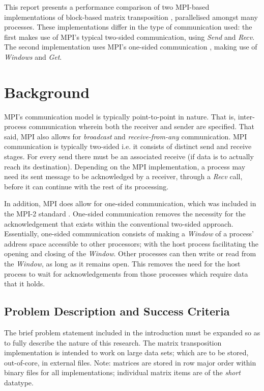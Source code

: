 \documentclass[journal,10pt,a4paper]{IEEEtran}
\begin{document}
This report presents a performance comparison of two MPI-based implementations of block-based matrix transposition \cite{transp}, parallelised amongst many processes. These implementations differ in the type of communication used: the first makes use of MPI's typical two-sided communication, using \textit{Send} and \textit{Recv}. The second implementation uses MPI's one-sided communication \cite{one}, making use of \textit{Windows} and \textit{Get}.

\section{Background}

MPI's communication model is typically point-to-point in nature. That is, inter-process communication wherein both the receiver and sender are specified. That said, MPI also allows for \textit{broadcast} and \textit{receive-from-any} communication. MPI communication is typically two-sided i.e. it consists of distinct send and receive stages. For every send there must be an associated receive (if data is to actually reach its destination). Depending on the MPI implementation, a process may need its sent message to be acknowledged by a receiver, through a \textit{Recv} call, before it can continue with the rest of its processing.

In addition, MPI does allow for one-sided communication, which was included in the MPI-2 standard \cite{one,one1}. One-sided communication removes the necessity for the acknowledgement that exists within the conventional two-sided approach. Essentially, one-sided communication consists of making a \textit{Window} of a process' address space accessible to other processors; with the host process facilitating the opening and closing of the \textit{Window}. Other processes can then write or read from the \textit{Window}, as long as it remains open. This removes the need for the host process to wait for acknowledgements from those processes which require data that it holds.


\subsection{Problem Description and Success Criteria}

The brief problem statement included in the introduction must be expanded so as to fully describe the nature of this research. The matrix transposition implementation is intended to work on large data sets; which are to be stored, out-of-core, in external files. Note: matrices are stored in row major order within binary files for all implementations; individual matrix items are of the \textit{short} datatype.
\end{document}
